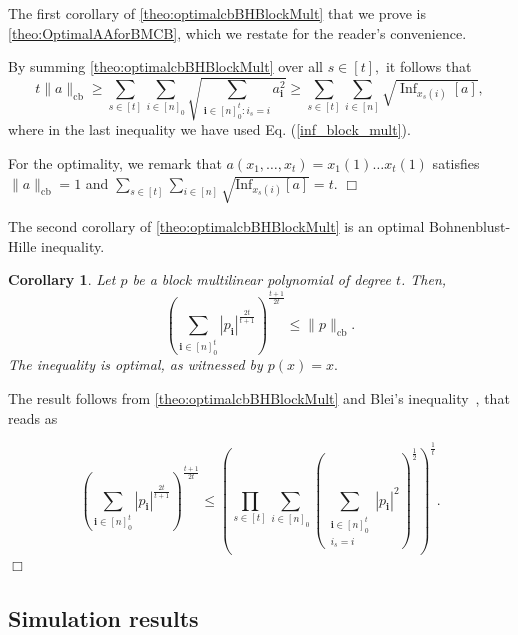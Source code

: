\documentclass[11pt]{article}
\DeclareMathOperator{\cb}{cb}
\newcommand{\norm}[1]{\|#1\|}
\newcommand{\1}{\mathbf{1}}
\newcommand\Inf{\mathrm{Inf}}
\newcommand{\ind}[1]{\mathbf{#1}}
\theoremstyle{plain}
\newtheorem{corollary}[theorem]{Corollary}
\theoremstyle{definition}
\theoremstyle{remark}
\renewenvironment{proof}[1][]{
    	\begin{trivlist}
     	\item[\hspace{\labelsep}{\em\noindent Proof#1:\/}]}
     	{{\hfill$\Box$}
    	\end{trivlist}
  }
\begin{document}
The first corollary of \cref{theo:optimalcbBHBlockMult} that we prove is \cref{theo:OptimalAAforBMCB}, which we restate for the reader's convenience. 

\theoOptimalAAforBMCB*

\begin{proof}
    By summing \cref{theo:optimalcbBHBlockMult} over all $s\in [t],$ it follows that 
    \begin{equation*}
        t\norm{a}_{\cb}\geq \sum_{s\in[t]}\sum_{i\in [n]_0}\sqrt{\sum_{\ind i\in [n]_0^t:i_s=i}a_{\ind i}^2}\geq \sum_{s\in[t]}\sum_{i\in [n]}\sqrt{\operatorname{Inf}_{x_s(i)}[a]},
    \end{equation*}where in the last inequality we have used Eq. (\ref{inf_block_mult}).
  
   
   For the optimality, we remark that $a(x_1,\dots,x_t)=x_1(1)\dots x_t(1)$ satisfies $\norm{a}_{\cb}=1$ and $\sum_{s\in[t]}\sum_{i\in [n]}\sqrt{\Inf_{x_{s}(i)}[a]}=t.$
\end{proof}
The second corollary of
\cref{theo:optimalcbBHBlockMult} is an optimal Bohnenblust-Hille inequality. 
\begin{corollary}
Let $p$ be a block multilinear polynomial of degree $t$. 
\label{coro:bhblockmultilinear}Then,
    \begin{equation}
        \label{eq:BHwithconstant1}
     \left(\sum_{\ind i \in [n]_0^t} |p_{\ind i}|^{\frac{2t}{t+1}}\right)^{\frac{t+1}{2t}} \leq \|p\|_{\cb}.
\end{equation}
The inequality is optimal, as witnessed by $p(x)=x.$
\end{corollary}


\begin{proof}
The result follows from \cref{theo:optimalcbBHBlockMult} and Blei's inequality~\cite[Lemma 5.3]{blei1979fractional}, that reads as 

    \begin{equation*}
        \label{eq:bleiinequality}
  \left(\sum_{\ind i \in [n]_0^t} |p_{\ind i}|^{\frac{2t}{t+1}}\right)^{\frac{t+1}{2t}} \leq \left(\prod_{s\in [t]} \sum_{i\in [n]_0} \left(\sum_{ \substack{\ind i \in [n]_0^t\\i_s=i}} |p_{\ind i}|^2 \right)^{\frac12}\right)^{\frac{1}{t}}.
    \end{equation*} 
\end{proof}


\subsection{Simulation results}\label{sec:simulationresults}
\end{document}
